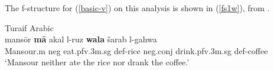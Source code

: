 \documentclass[output=paper,hidelinks]{langscibook}
\begin{document}
\ea \label{conjxp}
\z


\newpage

\ea  \label{wala-pred-lex2}
 \hfill{\citep[38]{AlruwailiSadler:2018}}
\z







\ea \label{laa-pred}
 \hfill{\citep[39]{AlruwailiSadler:2018}}
\z


The f-structure for (\ref{basic-v}) on this analysis is shown in (\ref{fs1w}), from \citet[38]{AlruwailiSadler:2018}.

\ea \label{basic-v} Turaif Arabic \citep[32]{AlruwailiSadler:2018}\\
\gll
mans\={o}r {\bf m\={a}} akal l-ruz {\bf wala} šarab l-gahwa\\
Mansour.{\sc m} {\sc neg} eat.{\sc pfv.3m.sg} {\sc def}-rice {\sc neg.conj}  drink.{\sc pfv.3m.sg} {\sc def}-coffee\\
\glt `Mansour neither ate the rice nor drank the coffee.'
\z






\end{document}
